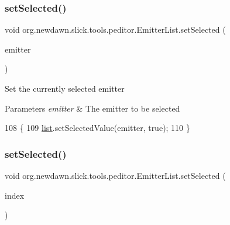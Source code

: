 \subsubsection{\texorpdfstring{set\+Selected()}{setSelected()}\hspace{0.1cm}{\footnotesize\ttfamily [1/2]}}
{\footnotesize\ttfamily void org.\+newdawn.\+slick.\+tools.\+peditor.\+Emitter\+List.\+set\+Selected (\begin{DoxyParamCaption}\item[{\mbox{\hyperlink{classorg_1_1newdawn_1_1slick_1_1particles_1_1_configurable_emitter}{Configurable\+Emitter}}}]{emitter }\end{DoxyParamCaption})\hspace{0.3cm}{\ttfamily [inline]}}

Set the currently selected emitter


\begin{DoxyParams}{Parameters}
{\em emitter} & The emitter to be selected \\
\hline
\end{DoxyParams}

\begin{DoxyCode}
108                                                          \{
109         \mbox{\hyperlink{classorg_1_1newdawn_1_1slick_1_1tools_1_1peditor_1_1_emitter_list_a201acbbfa375f50045f4f87452a9c722}{list}}.setSelectedValue(emitter, \textcolor{keyword}{true});
110     \}
\end{DoxyCode}
\mbox{\label{classorg_1_1newdawn_1_1slick_1_1tools_1_1peditor_1_1_emitter_list_a85497a336416b7d921ea40d32a880854}} 
\subsubsection{\texorpdfstring{set\+Selected()}{setSelected()}\hspace{0.1cm}{\footnotesize\ttfamily [2/2]}}
{\footnotesize\ttfamily void org.\+newdawn.\+slick.\+tools.\+peditor.\+Emitter\+List.\+set\+Selected (\begin{DoxyParamCaption}\item[{int}]{index }\end{DoxyParamCaption})\hspace{0.3cm}{\ttfamily [inline]}}

